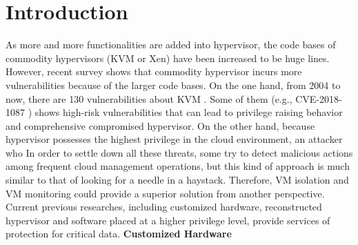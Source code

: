 \documentclass[conference]{IEEEtran}
\begin{document}
\section{Introduction}
As more and more functionalities are added into hypervisor, the code bases of commodity hypervisors (KVM or Xen) have been increased to be huge lines. However, recent survey shows that commodity hypervisor incurs more vulnerabilities because of the larger code bases. 
On the one hand, from 2004 to now, there are 130 vulnerabilities about KVM \cite{kvmcve}. Some of them (e.g., CVE-2018-1087 \cite{cve2018}) shows high-risk vulnerabilities that can lead to privilege raising behavior and comprehensive compromised hypervisor.
On the other hand, because hypervisor possesses the highest privilege in the cloud environment, an attacker who 
In order to settle down all these threats, some try to detect malicious actions among frequent cloud management operations, but this kind of approach is much similar to that of looking for a needle in a haystack. Therefore, VM isolation and VM monitoring could provide a superior solution from another perspective. 
Current previous researches, including customized hardware, reconstructed hypervisor and software placed at a higher privilege level, provide services of protection for critical data.
\textbf{Customized Hardware }
\end{document}
